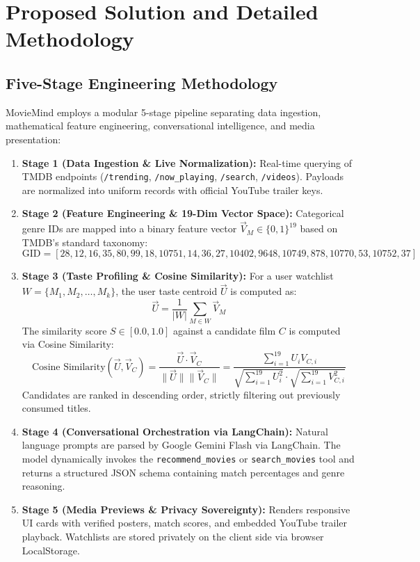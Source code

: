 \documentclass[11pt,a4paper]{article}
\begin{document}
\clearpage
\section{Proposed Solution and Detailed Methodology}

\subsection{Five-Stage Engineering Methodology}
MovieMind employs a modular 5-stage pipeline separating data ingestion, mathematical feature engineering, conversational intelligence, and media presentation:
\begin{enumerate}[leftmargin=*]
    \item \textbf{Stage 1 (Data Ingestion \& Live Normalization):} Real-time querying of TMDB endpoints (\texttt{/trending}, \texttt{/now\_playing}, \texttt{/search}, \texttt{/videos}). Payloads are normalized into uniform records with official YouTube trailer keys.
    \item \textbf{Stage 2 (Feature Engineering \& 19-Dim Vector Space):} Categorical genre IDs are mapped into a binary feature vector $\vec{V}_M \in \{0, 1\}^{19}$ based on TMDB's standard taxonomy:
    \[
    \text{GID} = [28, 12, 16, 35, 80, 99, 18, 10751, 14, 36, 27, 10402, 9648, 10749, 878, 10770, 53, 10752, 37]
    \]
    \item \textbf{Stage 3 (Taste Profiling \& Cosine Similarity):} For a user watchlist $W = \{M_1, M_2, \dots, M_k\}$, the user taste centroid $\vec{U}$ is computed as:
    \[
    \vec{U} = \frac{1}{|W|} \sum_{M \in W} \vec{V}_M
    \]
    The similarity score $S \in [0.0, 1.0]$ against a candidate film $C$ is computed via Cosine Similarity:
    \begin{equation}
        \text{Cosine Similarity}(\vec{U}, \vec{V}_C) = \frac{\vec{U} \cdot \vec{V}_C}{\|\vec{U}\| \|\vec{V}_C\|} = \frac{\sum_{i=1}^{19} U_i V_{C,i}}{\sqrt{\sum_{i=1}^{19} U_i^2} \cdot \sqrt{\sum_{i=1}^{19} V_{C,i}^2}}
    \end{equation}
    Candidates are ranked in descending order, strictly filtering out previously consumed titles.
    \item \textbf{Stage 4 (Conversational Orchestration via LangChain):} Natural language prompts are parsed by Google Gemini Flash via LangChain. The model dynamically invokes the \texttt{recommend\_movies} or \texttt{search\_movies} tool and returns a structured JSON schema containing match percentages and genre reasoning.
    \item \textbf{Stage 5 (Media Previews \& Privacy Sovereignty):} Renders responsive UI cards with verified posters, match scores, and embedded YouTube trailer playback. Watchlists are stored privately on the client side via browser LocalStorage.
\end{enumerate}
\end{document}

